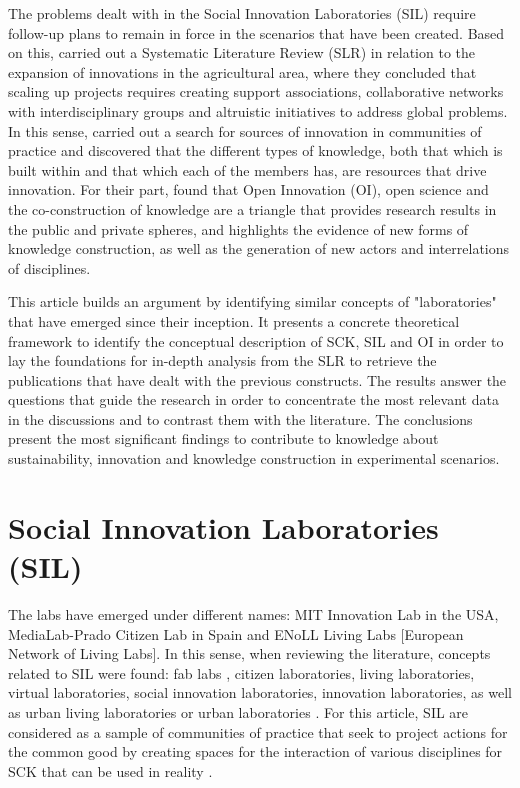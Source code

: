 \documentclass[english]{textolivre}
\begin{document}
The problems dealt with in the Social Innovation Laboratories (SIL) require follow-up plans to remain in force in the scenarios that have been created. Based on this, \textcite{wigboldus2016} carried out a Systematic Literature Review (SLR) in relation to the expansion of innovations in the agricultural area, where they concluded that scaling up projects requires creating support associations, collaborative networks with interdisciplinary groups and altruistic initiatives to address global problems. In this sense, \textcite{muller2015} carried out a search for sources of innovation in communities of practice and discovered that the different types of knowledge, both that which is built within and that which each of the members has, are resources that drive innovation. For their part, \textcite{ramirez-montoya2018} found that Open Innovation (OI), open science and the co-construction of knowledge are a triangle that provides research results in the public and private spheres, and highlights the evidence of new forms of knowledge construction, as well as the generation of new actors and interrelations of disciplines.

This article builds an argument by identifying similar concepts of "laboratories" that have emerged since their inception. It presents a concrete theoretical framework to identify the conceptual description of SCK, SIL and OI in order to lay the foundations for in-depth analysis from the SLR to retrieve the publications that have dealt with the previous constructs. The results answer the questions that guide the research in order to concentrate the most relevant data in the discussions and to contrast them with the literature. The conclusions present the most significant findings to contribute to knowledge about sustainability, innovation and knowledge construction in experimental scenarios.

\section{Social Innovation Laboratories (SIL)}
The labs have emerged under different names: MIT Innovation Lab \cite{mit2020} in the USA, MediaLab-Prado Citizen Lab \cite{medialab-prado2020} in Spain and ENoLL Living Labs \cite{enoll2020} [European Network of Living Labs]. In this sense, when reviewing the literature, concepts related to SIL were found: fab labs \cite{stacey2014}, citizen laboratories, living laboratories, virtual laboratories, social innovation laboratories, innovation laboratories, as well as urban living laboratories or urban laboratories \cite{yanez-figueroa2016}. For this article, SIL are considered as a sample of communities of practice \cite{komatsu2021} that seek to project actions for the common good \cite{ejderyan2019} by creating spaces for the interaction \cite{defila2020} of various disciplines \cite{barth2019} for SCK that can be used in reality \cite{williamson2015}.
\end{document}
